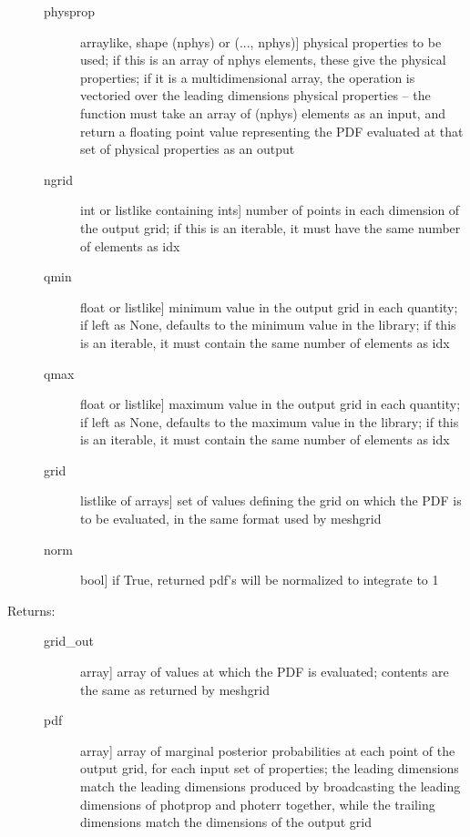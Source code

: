 \documentclass[letterpaper,10pt,english]{sphinxmanual}
\begin{document}
\begin{fulllineitems}
\begin{fulllineitems}
\begin{description}
\begin{description}
\item[{physprop}] \leavevmode{[}arraylike, shape (nphys) or (..., nphys){]}
physical properties to be used; if this is an array of
nphys elements, these give the physical properties; if
it is a multidimensional array, the operation is
vectoried over the leading dimensions
physical properties -- the function must take an array
of (nphys) elements as an input, and return a floating
point value representing the PDF evaluated at that set
of physical properties as an output

\item[{ngrid}] \leavevmode{[}int or listlike containing ints{]}
number of points in each dimension of the output grid;
if this is an iterable, it must have the same number of
elements as idx

\item[{qmin}] \leavevmode{[}float or listlike{]}
minimum value in the output grid in each quantity; if
left as None, defaults to the minimum value in the
library; if this is an iterable, it must contain the
same number of elements as idx

\item[{qmax}] \leavevmode{[}float or listlike{]}
maximum value in the output grid in each quantity; if
left as None, defaults to the maximum value in the
library; if this is an iterable, it must contain the
same number of elements as idx

\item[{grid}] \leavevmode{[}listlike of arrays{]}
set of values defining the grid on which the PDF is to
be evaluated, in the same format used by meshgrid

\item[{norm}] \leavevmode{[}bool{]}
if True, returned pdf's will be normalized to integrate
to 1

\end{description}

\item[{Returns:}] \leavevmode\begin{description}
\item[{grid\_out}] \leavevmode{[}array{]}
array of values at which the PDF is evaluated; contents
are the same as returned by meshgrid

\item[{pdf}] \leavevmode{[}array{]}
array of marginal posterior probabilities at each point
of the output grid, for each input set of properties; the leading
dimensions match the leading dimensions produced by
broadcasting the leading dimensions of photprop and
photerr together, while the trailing dimensions match
the dimensions of the output grid


\end{description}
\end{description}
\end{fulllineitems}
\end{fulllineitems}
\end{document}
